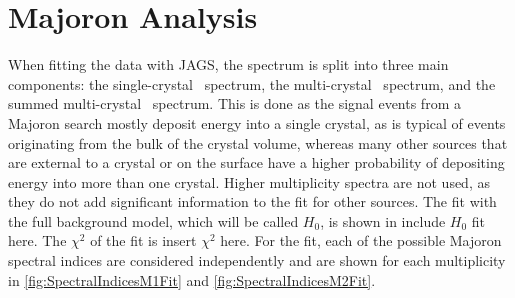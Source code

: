 \section{Majoron Analysis}
When fitting the data with JAGS, the spectrum is split into three main components: the single-crystal \Mone~spectrum, the multi-crystal \Mtwo~spectrum, and the summed multi-crystal \Msum~spectrum.
This is done as the signal events from a Majoron search mostly deposit energy into a single crystal, as is typical of events originating from the bulk of the crystal volume, whereas many other sources that are external to a crystal or on the surface have a higher probability of depositing energy into more than one crystal.
Higher multiplicity spectra are not used, as they do not add significant information to the fit for other sources.
The fit with the full background model, which will be called $H_0$, is shown in \color{red}include $H_0$ fit here\color{black}.
The $\chi^2$ of the fit is \color{red}insert $\chi^2$ here\color{black}.
For the fit, each of the possible Majoron spectral indices are considered independently and are shown for each multiplicity in \autoref{fig:SpectralIndicesM1Fit} and \autoref{fig:SpectralIndicesM2Fit}.

